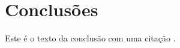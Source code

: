 \documentclass[12pt,a4paper,final]{article}
\begin{document}
\begin{table}[]
\centering
{}
\caption{Tabela Exemplo}
\label{tab:my-table}
\end{table}

\section{Conclusões}
Este é o texto da conclusão com uma citação \cite{su15010857}.

\newpage
\printbibliography
\end{document}
